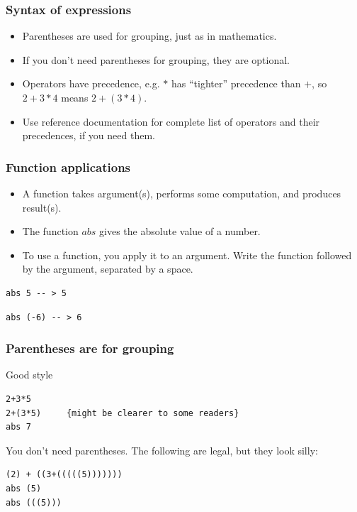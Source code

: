 \documentclass{beamer}
\begin{document}
\begin{frame}
\frametitle{Syntax of expressions}

\begin{itemize}
\item Parentheses are used for grouping, just as in mathematics. 
\item If you don't need parentheses for grouping, they are
  optional.
\item Operators have precedence, e.g. $*$ has ``tighter''
  precedence than $+$, so $2+3*4$ means $2+(3*4)$.
\item Use reference documentation for complete list of operators
  and their precedences, if you need them.
\end{itemize}
\end{frame}

\begin{frame}[fragile]
\frametitle{Function applications}

\begin{itemize}
\item A function takes argument(s), performs some computation, and
  produces result(s).
\item The function $abs$ gives the absolute value of a number.
\item To use a function, you apply it to an argument.  Write the
  function followed by the argument, separated by a space.
\end{itemize}

\begin{verbatim}
abs 5 -- > 5
\end{verbatim}

\begin{verbatim}
abs (-6) -- > 6
\end{verbatim}

\end{frame}

\begin{frame}[fragile]

\frametitle{Parentheses are for grouping}

Good style

\begin{verbatim}
2+3*5
2+(3*5)     {might be clearer to some readers}
abs 7
\end{verbatim}

You don't need parentheses.  The following are legal, but they look
silly:

\begin{verbatim}
(2) + ((3+(((((5)))))))
abs (5)
abs (((5)))
\end{verbatim}

\end{frame}
\end{document}
